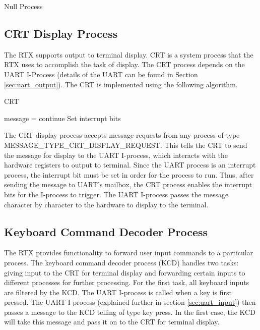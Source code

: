 \documentclass[12pt]{report}
\begin{document}
\begin{algorithm}
    \caption{Null Process}
    \begin{algorithmic}[1]
        \EndWhile
      \EndFunction
    \end{algorithmic}
\end{algorithm}


\subsection{CRT Display Process}
\label{sec:crt_process}
The RTX supports output to terminal display. CRT is a system process that the RTX uses to accomplish the task of display. The CRT process depends on the UART I-Process (details of the UART can be found in Section \ref{sec:uart_output}). The CRT is implemented using the following algorithm.

\begin{algorithm}
  \caption{CRT}
  \begin{algorithmic}[1]
          \State message = 
              \State continue
          \EndIf
          \State {}
          \State Set interrupt bits
      \EndWhile
    \EndFunction
  \end{algorithmic}
\end{algorithm}

 The CRT display process accepts message requests from any process of type MESSAGE\_TYPE\_CRT\_DISPLAY\_REQUEST. This tells the CRT to send the message for display to the UART I-process, which interacts with the hardware registers to output to terminal. Since the UART process is an interrupt process, the interrupt bit must be set in order for the process to run. Thus, after sending the message to UART's mailbox, the CRT process enables the interrupt bits for the I-process to trigger. The UART I-process passes the message character by character to the hardware to display to the terminal.

\subsection{Keyboard Command Decoder Process}
\label{sec:kcd_process}
The RTX provides functionality to forward user input commands to a particular process. The keyboard command decoder process (KCD) handles two tasks: giving input to the CRT for terminal display and forwarding certain inputs to different processes for further processing. For the first task, all keyboard inputs are filtered by the KCD. The UART I-process is called when a key is first pressed. The UART I-process (explained further in section \ref{sec:uart_input}) then passes a message to the KCD telling of type key press. In the first case, the KCD will take this message and pass it on to the CRT for terminal display.
\end{document}

